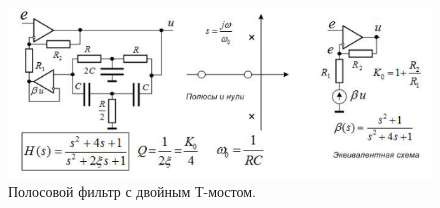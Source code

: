 \documentclass[12pt,a4paper]{article}
\begin{document}
\begin{figure}[H]
    \begin{center}
    \includegraphics[width=12cm]{полосовой_фильтр.png}
    \caption{Полосовой фильтр с двойным Т-мостом.}
    \label{line} %
    \end{center}
\end{figure}
\end{document}
